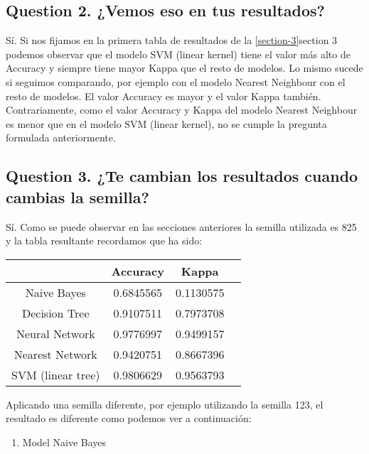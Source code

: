 \documentclass[]{article}
\providecommand{\tightlist}{%
  \setlength{\itemsep}{0pt}\setlength{\parskip}{0pt}}
\begin{document}
\hypertarget{question-2}{%
	\subsection{Question 2. ¿Vemos eso en tus resultados?}\label{question-2}}

Sí. Si nos fijamos en la primera tabla de resultados de la \ref{section-3}{section 3} podemos observar que el modelo SVM (linear kernel) tiene el valor más alto de Accuracy y siempre tiene mayor Kappa que el resto de modelos. Lo mismo sucede si seguimos comparando, por ejemplo con el modelo Nearest Neighbour con el resto de modelos. El valor Accuracy es mayor y el valor Kappa también. Contrariamente, como el valor Accuracy y Kappa del modelo Nearest Neighbour es menor que en el modelo SVM (linear kernel), no se cumple la pregunta formulada anteriormente.

\hypertarget{question-3}{%
	\subsection{Question 3. ¿Te cambian los resultados cuando cambias la semilla?}\label{question-3}}

Sí. Como se puede observar en las secciones anteriores la semilla utilizada es 825 y la tabla resultante recordamos que ha sido:

\begin{center}
	\begin{tabular}{ |c|c|c|c| } 
		\hline
		& Accuracy & Kappa \\
		\hline
		Naive Bayes & 0.6845565 & 0.1130575 \\ 
		Decision Tree & 0.9107511 & 0.7973708 \\ 
		Neural Network & 0.9776997 & 0.9499157 \\
		Nearest Network & 0.9420751 & 0.8667396 \\
		SVM (linear tree) & 0.9806629 & 0.9563793 \\
		\hline
	\end{tabular}
\end{center}

Aplicando una semilla diferente, por ejemplo utilizando la semilla 123, el resultado es diferente como podemos ver a continuación:

\begin{enumerate}
	\def\labelenumi{\arabic{enumi}.}
	\tightlist
	\item
	Model Naive Bayes
\end{enumerate}
\end{document}
